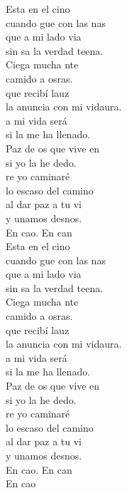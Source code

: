 \begin{cancion}%
	Esta en el cino \\
	cuando gue con las nas\\
	 que a mi lado via \\
	sin sa la verdad teena.\\
\jump
	Ciega mucha nte \\
	camido a osras.\\
	que recibí lauz \\
	la anuncia con mi vidaura.\\
\jump
	a mi vida será\\
	si la  me ha llenado. \\
	Paz de os que vive en  \\
	si yo la he dedo.\\
\jump
	re yo caminaré \\
	lo escaso del camino\\
	al dar  paz a tu vi \\
	y unamos desnos.\\
\jump
	En cao. En can\\
\jump
	Esta en el cino \\
	cuando gue con las nas\\
	 que a mi lado via \\
	sin sa la verdad teena.\\
\jump
	Ciega mucha nte \\
	camido a osras.\\
	que recibí lauz \\
	la anuncia con mi vidaura.\\
\jump
	a mi vida será\\
	si la  me ha llenado. \\
	Paz de os que vive en  \\
	si yo la he dedo.\\
\jump
	re yo caminaré \\
	lo escaso del camino\\
	al dar  paz a tu vi \\
	y unamos desnos.\\
\jump
	En cao. En can\\
	En cao\\
\end{cancion}%

